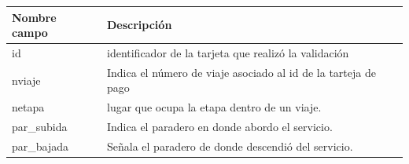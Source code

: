 \documentclass[12pt]{article}
\begin{document}
\begin{table}[h]
\begin{center}
  \begin{tabular}{| l | p{7cm} |}
    \hline
    Nombre campo & Descripción \\ \hline \hline
    id & identificador de la tarjeta que realizó la validación \\ \hline
    nviaje &  Indica el número de viaje asociado al id de la tarteja de pago\\ \hline
    netapa &  lugar que ocupa la etapa dentro de un viaje.\\ \hline
    par\_subida & Indica el paradero en donde abordo el servicio. \\ \hline
    par\_bajada & Señala el paradero de donde descendió del servicio. \\ \hline

\end{tabular}
\end{center}
\end{table}
\end{document}
